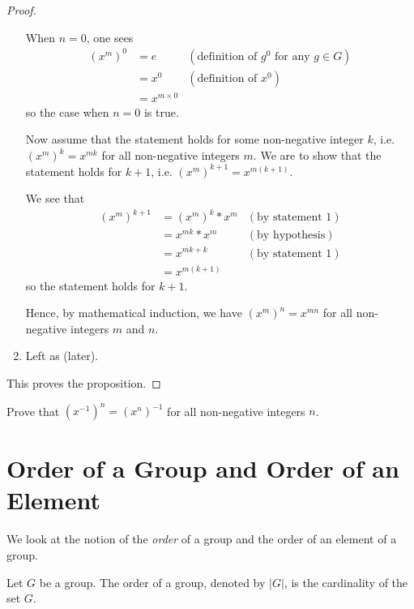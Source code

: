 \begin{proof}
\begin{enumerate}
        When $n = 0$, one sees
        \begin{align*}
            \left(x^m\right)^0 &= e & (\text{definition of }g^0 \text{ for any }g\in G)\\
            &= x^0 & (\text{definition of }x^0)\\
            &= x^{m \times 0}
        \end{align*}
        so the case when $n = 0$ is true.

        Now assume that the statement holds for some non-negative integer $k$, i.e. $\left(x^m\right)^k = x^{mk}$ for all non-negative integers $m$. We are to show that the statement holds for $k+1$, i.e. $\left(x^m\right)^{k+1} = x^{m(k+1)}$.

        We see that
        \begin{align*}
            \left(x^m\right)^{k+1} &= \left(x^m\right)^k\ast x^m & (\text{by statement 1})\\
            &= x^{mk} \ast x^m & (\text{by hypothesis})\\
            &= x^{mk+k} & (\text{by statement 1})\\
            &= x^{m(k+1)}
        \end{align*}
        so the statement holds for $k+1$.

        Hence, by mathematical induction, we have $\left(x^m\right)^n = x^{mn}$ for all non-negative integers $m$ and $n$.

        \item Left as  (later).
    \end{enumerate}
    This proves the proposition.
\end{proof}
\begin{exercise}\label{exercise-swap-inverse-with-power}
    Prove that $(x^{-1})^n = (x^n)^{-1}$ for all non-negative integers $n$.
\end{exercise}

\section{Order of a Group and Order of an Element}
We look at the notion of the \textit{order} of a group and the order of an element of a group.

\begin{definition}
    Let $G$ be a group. The order of a group, denoted by $|G|$, is the cardinality of the set $G$.
\end{definition}

